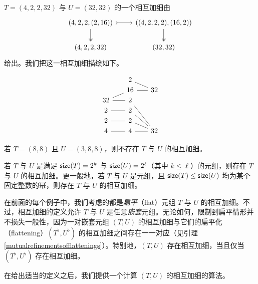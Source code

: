 \begin{example}
$T = (4, 2, 2, 32)$ 与 $U = (32, 32)$ 的一个相互加细由
    \[ \begin{tikzcd}
 (4,2,2,(2,16))\ar[r,rightarrowtail] \ar[d, two heads] & ((4,2,2,2),(16,2)) \ar[d,two heads] \\
(4,2,2,32) & (32,32)
\end{tikzcd} \]
给出。我们把这一相互加细描绘如下。

\[ \begin{tikzcd} [row sep = 1, column sep = 8]
 & & 2 & & \\
 & & 16 & & \ar[ll,-]\ar[ull,-]32\\
32\ar[rr,-] \ar[urr,-]  & & 2 & & \\
2\ar[rr,-]  & & 2 & & \\
2\ar[rr,-]  & & 2 & & \\
4 \ar[rr,-] & & 4 & & \ar[ll,-]\ar[ull,-]\ar[uull,-]\ar[uuull,-] 32\\
\end{tikzcd} \]
\end{example}

\begin{example}
    若 $T = (8,8)$ 且 $U = (3,8,8)$，则不存在 $T$ 与 $U$ 的相互加细。
\end{example}

\begin{example}
    若 $T$ 与 $U$ 是满足 $\mathsf{size}(T) = 2^k$ 与 $\mathsf{size}(U) = 2^\ell$（其中 $k \leq \ell$）的元组，则存在 $T$ 与 $U$ 的相互加细。更一般地，若 $T$ 与 $U$ 是元组，且 $\mathsf{size}(T) \leq \mathsf{size}(U)$ 均为某个固定整数的幂，则存在 $T$ 与 $U$ 的相互加细。
\end{example}

\begin{observation} 在前面的每个例子中，我们考虑的都是{\it 扁平}（flat）元组 $T$ 与 $U$ 的相互加细。不过，相互加细的定义允许 $T$ 与 $U$ 是任意{\it 嵌套}元组。无论如何，限制到扁平情形并不损失一般性，因为一对嵌套元组 $(T,U)$ 的相互加细与它们的扁平化（flattening）$(T^\flat,U^\flat)$ 的相互加细之间存在一一对应（见引理 \ref{mutualrefinementsofflattenings}）。特别地，$(T,U)$ 存在相互加细，当且仅当 $(T^\flat,U^\flat)$ 存在相互加细。
\end{observation}

在给出适当的定义之后，我们提供一个计算 $(T,U)$ 的相互加细的算法。

